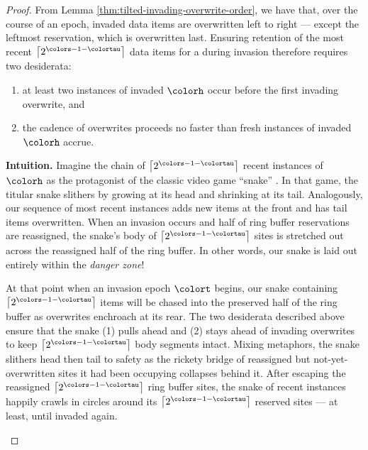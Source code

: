 \begin{proof}
From Lemma \ref{thm:tilted-invading-overwrite-order}, we have that, over the course of an epoch, invaded data items are overwritten left to right --- except the leftmost reservation, which is overwritten last.
Ensuring retention of the most recent $\left\lceil 2^{\colors - 1 - \colortau} \right\rceil$ data items for a \hv{} during invasion therefore requires two desiderata:
\begin{enumerate}
\item at least two instances of invaded \hv{} $\colorh$ occur before the first invading overwrite, and
\item the cadence of overwrites proceeds no faster than fresh instances of invaded \hv{} $\colorh$ accrue.
\end{enumerate}


\begin{mybox}
\textbf{Intuition.}
Imagine the chain of $\left\lceil 2^{\colors - 1 - \colortau} \right\rceil$ recent instances of \hv{} $\colorh$ as the protagonist of the classic video game ``snake'' \citep{de2016complexity}.
In that game, the titular snake slithers by growing at its head and shrinking at its tail.
Analogously, our sequence of most recent \hv{} instances adds new items at the front and has tail items overwritten.
When an invasion occurs and half of ring buffer reservations are reassigned, the snake's body of $\left\lceil 2^{\colors - 1 - \colortau} \right\rceil$ sites is stretched out across the reassigned half of the ring buffer.
In other words, our snake is laid out entirely within the \textit{danger zone}!

At that point when an invasion epoch $\colort$ begins, our snake containing $\left\lceil 2^{\colors - 1 - \colortau} \right\rceil$ items will be chased into the preserved half of the ring buffer as overwrites enchroach at its rear.
The two desiderata described above ensure that the snake (1) pulls ahead and (2) stays ahead of invading overwrites to keep $\left\lceil 2^{\colors - 1 - \colortau} \right\rceil$ body segments intact.
Mixing metaphors, the snake slithers head then tail to safety as the rickety bridge of reassigned but not-yet-overwritten sites it had been occupying collapses behind it.
After escaping the reassigned $\left\lceil 2^{\colors - 1 - \colortau} \right\rceil$ ring buffer sites, the snake of recent \hv{} instances happily crawls in circles around its $\left\lceil 2^{\colors - 1 - \colortau} \right\rceil$ reserved sites --- at least, until invaded again.
\end{mybox}


\end{proof}
